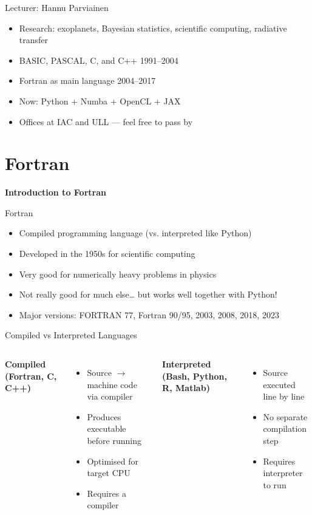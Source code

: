 \begin{frame}{Lecturer: Hannu Parviainen}
  \begin{itemize}
    \item Research: exoplanets, Bayesian statistics, scientific computing, radiative transfer
    \item BASIC, PASCAL, C, and C++ 1991--2004
    \item Fortran as main language 2004--2017
    \item Now: Python + Numba + OpenCL + JAX
    \item Offices at IAC and ULL — feel free to pass by
  \end{itemize}
\end{frame}



\section{Fortran}

\begin{frame}
	\centering
	\Huge \textbf{Introduction to Fortran}
\end{frame}

\begin{frame}{Fortran}
	\begin{itemize}
		\item Compiled programming language (vs. interpreted like Python)
		\item Developed in the 1950s for scientific computing
		\item Very good for numerically heavy problems in physics
		\item Not really good for much else… but works well together with Python!
		\item Major versions: FORTRAN 77, Fortran 90/95, 2003, 2008, 2018, 2023
	\end{itemize}
\end{frame}



\begin{frame}{Compiled vs Interpreted Languages}
	\begin{columns}[T]
		\textbf{Compiled (Fortran, C, C++)}
		\begin{itemize}
			\item Source $\to$ machine code via compiler
			\item Produces executable before running
			\item Optimised for target CPU
			\item Requires a compiler
		\end{itemize}
		
		\textbf{Interpreted (Bash, Python, R, Matlab)}
		\begin{itemize}
			\item Source executed line by line
			\item No separate compilation step
			\item Requires interpreter to run
		\end{itemize}
	\end{columns}
\end{frame}


